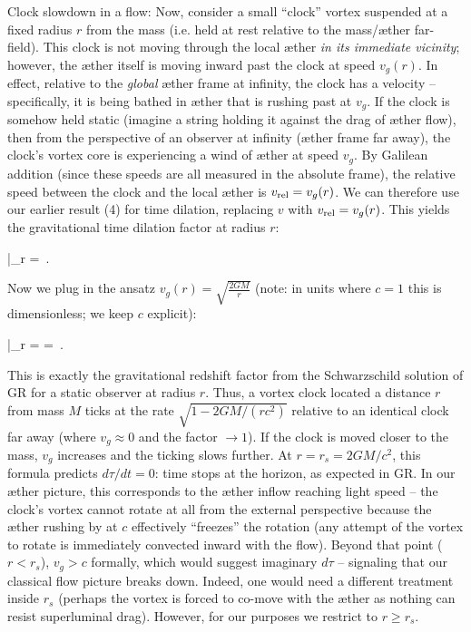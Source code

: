 \documentclass[aps,preprint,superscriptaddress]{revtex4}
\begin{document}
Clock slowdown in a flow: Now, consider a small “clock” vortex suspended at a fixed radius $r$ from the mass (i.e. held at rest relative to the mass/æther far-field). This clock is not moving through the local æther \textit{in its immediate vicinity}; however, the æther itself is moving inward past the clock at speed $v_g(r)$. In effect, relative to the \textit{global} æther frame at infinity, the clock has a velocity – specifically, it is being bathed in æther that is rushing past at $v_g$. If the clock is somehow held static (imagine a string holding it against the drag of æther flow), then from the perspective of an observer at infinity (æther frame far away), the clock’s vortex core is experiencing a wind of æther at speed $v_g$. By Galilean addition (since these speeds are all measured in the absolute frame), the relative speed between the clock and the local æther is $v_{\rm rel}=v_g(r)$. We can therefore use our earlier result (4) for time dilation, replacing $v$ with $v_{\rm rel}=v_g(r)$. This yields the gravitational time dilation factor at radius $r$:

\Big|_{r} \;=\; \,. 

Now we plug in the ansatz $v_g(r) = \sqrt{\frac{2GM}{r}}$ (note: in units where $c=1$ this is dimensionless; we keep $c$ explicit):

\Big|_{r} \;=\;  \;=\; \,. 

This is exactly the gravitational redshift factor from the Schwarzschild solution of GR for a static observer at radius $r$. Thus, a vortex clock located a distance $r$ from mass $M$ ticks at the rate $\sqrt{1-2GM/(rc^2)}$ relative to an identical clock far away (where $v_g\approx0$ and the factor $\to1$). If the clock is moved closer to the mass, $v_g$ increases and the ticking slows further. At $r=r_s=2GM/c^2$, this formula predicts $d\tau/dt=0$: time stops at the horizon, as expected in GR. In our æther picture, this corresponds to the æther inflow reaching light speed – the clock’s vortex cannot rotate at all from the external perspective because the æther rushing by at $c$ effectively “freezes” the rotation (any attempt of the vortex to rotate is immediately convected inward with the flow). Beyond that point ($r<r_s$), $v_g>c$ formally, which would suggest imaginary $d\tau$ – signaling that our classical flow picture breaks down. Indeed, one would need a different treatment inside $r_s$ (perhaps the vortex is forced to co-move with the æther as nothing can resist superluminal drag). However, for our purposes we restrict to $r \ge r_s$.
\end{document}
